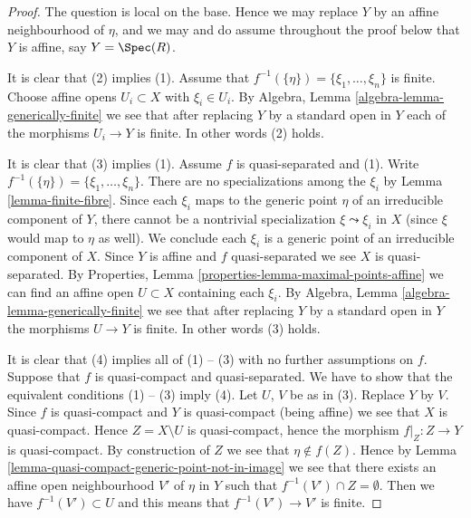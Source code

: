 \begin{proof}
The question is local on the base. Hence we may replace $Y$ by an
affine neighbourhood of $\eta$, and we may and do assume throughout
the proof below that $Y$ is affine, say $Y = \Spec(R)$.

\medskip\noindent
It is clear that (2) implies (1).
Assume that $f^{-1}(\{\eta\}) = \{\xi_1, \ldots, \xi_n\}$ is finite.
Choose affine opens $U_i \subset X$ with $\xi_i \in U_i$.
By Algebra, Lemma \ref{algebra-lemma-generically-finite} we see
that after replacing $Y$ by a standard open in
$Y$ each of the morphisms $U_i \to Y$ is finite.
In other words (2) holds.

\medskip\noindent
It is clear that (3) implies (1). Assume $f$ is quasi-separated and (1).
Write $f^{-1}(\{\eta\}) = \{\xi_1, \ldots, \xi_n\}$. There are no
specializations among the $\xi_i$ by Lemma \ref{lemma-finite-fibre}.
Since each $\xi_i$ maps to the generic
point $\eta$ of an irreducible component of $Y$, there cannot be a
nontrivial specialization $\xi \leadsto \xi_i$ in $X$
(since $\xi$ would map to $\eta$ as well).
We conclude each $\xi_i$ is a generic point of an
irreducible component of $X$.
Since $Y$ is affine and $f$ quasi-separated we see $X$ is quasi-separated.
By Properties, Lemma \ref{properties-lemma-maximal-points-affine}
we can find an affine open $U \subset X$ containing each $\xi_i$.
By Algebra, Lemma \ref{algebra-lemma-generically-finite} we see
that after replacing $Y$ by a standard open in
$Y$ the morphisms $U \to Y$ is finite.
In other words (3) holds.

\medskip\noindent
It is clear that (4) implies all of (1) -- (3) with no further assumptions
on $f$. Suppose that $f$ is quasi-compact and quasi-separated. We have to
show that the equivalent conditions (1) -- (3) imply (4).
Let $U$, $V$ be as in (3). Replace $Y$ by $V$. Since $f$ is quasi-compact
and $Y$ is quasi-compact (being affine) we see that $X$ is quasi-compact.
Hence $Z = X \setminus U$ is quasi-compact, hence the morphism
$f|_Z : Z \to Y$ is quasi-compact. By construction of $Z$ we see that
$\eta \not \in f(Z)$. Hence by
Lemma \ref{lemma-quasi-compact-generic-point-not-in-image}
we see that there exists an affine open
neighbourhood $V'$ of $\eta$ in $Y$ such that $f^{-1}(V') \cap Z = \emptyset$.
Then we have $f^{-1}(V') \subset U$ and this means
that $f^{-1}(V') \to V'$ is finite.
\end{proof}

